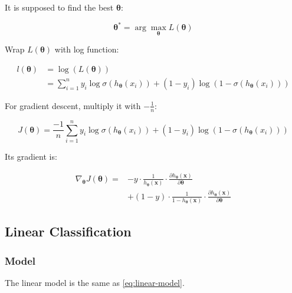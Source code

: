 \documentclass[journal, a4paper]{IEEEtran}
\newcommand{\argmax}{\arg\!\max}
\begin{document}
It is supposed to find the best $\boldsymbol\theta$:

\begin{equation}
    \boldsymbol{\theta}^{\ast} = \argmax_{\boldsymbol\theta}{L(\boldsymbol\theta)}
\end{equation}

Wrap $L(\boldsymbol\theta)$ with log function:

\begin{equation}\label{eq:log-likelihood}
    \begin{split}
        l(\boldsymbol\theta) & = \log(L(\boldsymbol\theta)) \\
                             & = \sum_{i=1}^{n}y_i \log \sigma(h_{\boldsymbol\theta}(x_i)) + (1-y_i)\log(1-\sigma(h_{\boldsymbol\theta}(x_i)))
    \end{split}
\end{equation}

For gradient descent, multiply it with $-\frac{1}{n}$:

\begin{equation}
    J(\boldsymbol\theta) = \frac{-1}{n}\sum_{i=1}^{n}y_i \log \sigma(h_{\boldsymbol\theta}(x_i)) + (1-y_i)\log(1-\sigma(h_{\boldsymbol\theta}(x_i)))
\end{equation}

Its gradient is:

\begin{equation}
    \begin{split}
        \nabla_{\boldsymbol\theta}J(\boldsymbol\theta) = & -y\cdot\frac{1}{h_{\boldsymbol\theta}(\mathbf{x})}\cdot\frac{\partial h_{\boldsymbol\theta}(\mathbf{x})}{\partial \boldsymbol\theta} \\
        & + (1-y)\cdot\frac{1}{1-h_{\boldsymbol\theta}(\mathbf{x})}\cdot\frac{\partial h_{\boldsymbol\theta}(\mathbf{x})}{\partial \boldsymbol\theta}
    \end{split}
\end{equation}

\subsection{Linear Classification}

\subsubsection{Model}

The linear model is the same as \eqref{eq:linear-model}.
\end{document}
